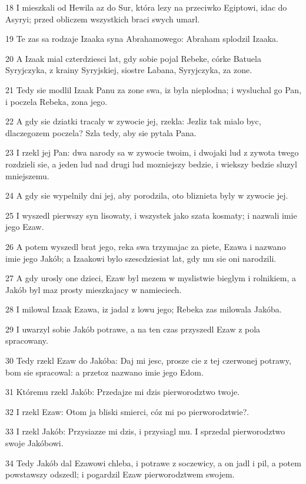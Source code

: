 \par 18 I mieszkali od Hewila az do Sur, która lezy na przeciwko Egiptowi, idac do Asyryi; przed obliczem wszystkich braci swych umarl.
\par 19 Te zas sa rodzaje Izaaka syna Abrahamowego: Abraham splodzil Izaaka.
\par 20 A Izaak mial czterdziesci lat, gdy sobie pojal Rebeke, córke Batuela Syryjczyka, z krainy Syryjskiej, siostre Labana, Syryjczyka, za zone.
\par 21 Tedy sie modlil Izaak Panu za zone swa, iz byla nieplodna; i wysluchal go Pan, i poczela Rebeka, zona jego.
\par 22 A gdy sie dziatki tracaly w zywocie jej, rzekla: Jezliz tak mialo byc, dlaczegozem poczela? Szla tedy, aby sie pytala Pana.
\par 23 I rzekl jej Pan: dwa narody sa w zywocie twoim, i dwojaki lud z zywota twego rozdzieli sie, a jeden lud nad drugi lud mozniejszy bedzie, i wiekszy bedzie sluzyl mniejszemu.
\par 24 A gdy sie wypelnily dni jej, aby porodzila, oto bliznieta byly w zywocie jej.
\par 25 I wyszedl pierwszy syn lisowaty, i wszystek jako szata kosmaty; i nazwali imie jego Ezaw.
\par 26 A potem wyszedl brat jego, reka swa trzymajac za piete, Ezawa i nazwano imie jego Jakób; a Izaakowi bylo szescdziesiat lat, gdy mu sie oni narodzili.
\par 27 A gdy urosly one dzieci, Ezaw byl mezem w myslistwie bieglym i rolnikiem, a Jakób byl maz prosty mieszkajacy w namieciech.
\par 28 I milowal Izaak Ezawa, iz jadal z lowu jego; Rebeka zas milowala Jakóba.
\par 29 I uwarzyl sobie Jakób potrawe, a na ten czas przyszedl Ezaw z pola spracowany.
\par 30 Tedy rzekl Ezaw do Jakóba: Daj mi jesc, prosze cie z tej czerwonej potrawy, bom sie spracowal: a przetoz nazwano imie jego Edom.
\par 31 Któremu rzekl Jakób: Przedajze mi dzis pierworodztwo twoje.
\par 32 I rzekl Ezaw: Otom ja bliski smierci, cóz mi po pierworodztwie?.
\par 33 I rzekl Jakób: Przysiazze mi dzis, i przysiagl mu. I sprzedal pierworodztwo swoje Jakóbowi.
\par 34 Tedy Jakób dal Ezawowi chleba, i potrawe z soczewicy, a on jadl i pil, a potem powstawszy odszedl; i pogardzil Ezaw pierworodztwem swojem.

